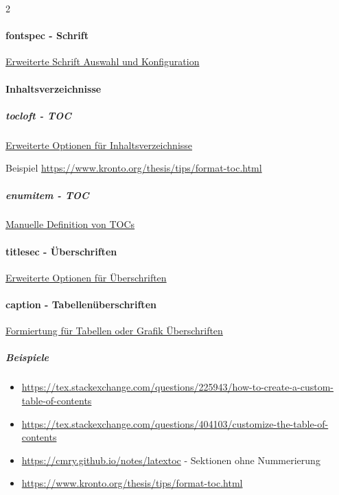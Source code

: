 \documentclass[
  a4paper,
  twoside]{article}
\providecommand{\tightlist}{%
  \setlength{\itemsep}{0pt}\setlength{\parskip}{0pt}}
\let\oldparagraph\paragraph
\renewcommand{\paragraph}[1]{\oldparagraph{#1}\mbox{}}
\let\oldsubparagraph\subparagraph
\renewcommand{\subparagraph}[1]{\oldsubparagraph{#1}\mbox{}}
\begin{document}
\begin {multicols}{2}
\hypertarget{fontspec---schrift}{%
\paragraph{fontspec - Schrift}\label{fontspec---schrift}}

\href{https://www.ctan.org/pkg/fontspec}{Erweiterte Schrift Auswahl und Konfiguration}

\hypertarget{inhaltsverzeichnisse}{%
\paragraph{Inhaltsverzeichnisse}\label{inhaltsverzeichnisse}}

\hypertarget{tocloft---toc}{%
\subparagraph{tocloft - TOC}\label{tocloft---toc}}

\href{https://www.ctan.org/pkg/tocloft}{Erweiterte Optionen für Inhaltsverzeichnisse}

Beispiel \url{https://www.kronto.org/thesis/tips/format-toc.html}

\hypertarget{enumitem---toc}{%
\subparagraph{enumitem - TOC}\label{enumitem---toc}}

\href{https://ctan.org/pkg/enumitem?lang=de}{Manuelle Definition von TOCs}

\hypertarget{titlesec---uxfcberschriften}{%
\paragraph{titlesec - Überschriften}\label{titlesec---uxfcberschriften}}

\href{https://ctan.org/pkg/titlesec?lang=de}{Erweiterte Optionen für Überschriften}

\hypertarget{caption---tabellenuxfcberschriften}{%
\paragraph{caption - Tabellenüberschriften}\label{caption---tabellenuxfcberschriften}}

\href{https://ctan.org/pkg/caption?lang=de}{Formiertung für Tabellen oder Grafik Überschriften}

\hypertarget{beispiele}{%
\subparagraph{Beispiele}\label{beispiele}}

\begin{itemize}
\tightlist
\item
  \url{https://tex.stackexchange.com/questions/225943/how-to-create-a-custom-table-of-contents}
\item
  \url{https://tex.stackexchange.com/questions/404103/customize-the-table-of-contents}
\item
  \url{https://cmry.github.io/notes/latextoc} - Sektionen ohne Nummerierung
\item
  \url{https://www.kronto.org/thesis/tips/format-toc.html}
\end{itemize}

\end {multicols}
\end{document}
